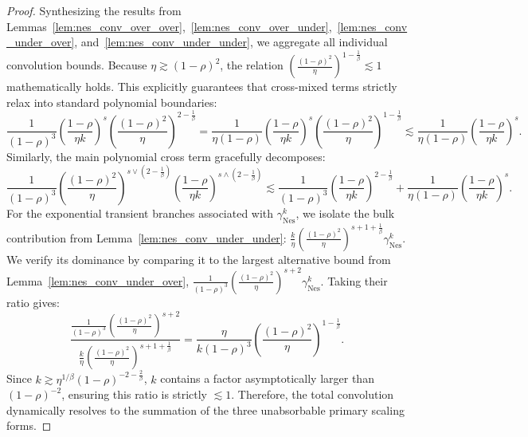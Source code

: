 \begin{proof}
Synthesizing the results from Lemmas~\ref{lem:nes_conv_over_over},~\ref{lem:nes_conv_over_under},~\ref{lem:nes_conv_under_over}, and~\ref{lem:nes_conv_under_under}, we aggregate all individual convolution bounds.
Because $\eta \gtrsim (1-\rho)^2$, the relation $\left(\frac{(1-\rho)^2}{\eta}\right)^{1-\frac{1}{\beta}} \lesssim 1$ mathematically holds. This explicitly guarantees that cross-mixed terms strictly relax into standard polynomial boundaries:
\begin{equation*}
    \frac{1}{(1-\rho)^3} \left(\frac{1-\rho}{\eta k}\right)^s \left(\frac{(1-\rho)^2}{\eta}\right)^{2-\frac{1}{\beta}} = \frac{1}{\eta(1-\rho)} \left(\frac{1-\rho}{\eta k}\right)^s \left(\frac{(1-\rho)^2}{\eta}\right)^{1-\frac{1}{\beta}} \lesssim \frac{1}{\eta(1-\rho)} \left(\frac{1-\rho}{\eta k}\right)^s.
\end{equation*}
Similarly, the main polynomial cross term gracefully decomposes:
\begin{equation*}
    \frac{1}{(1-\rho)^3} \left(\frac{(1-\rho)^2}{\eta}\right)^{s \vee (2-\frac{1}{\beta})} \left(\frac{1-\rho}{\eta k}\right)^{s \wedge (2-\frac{1}{\beta})} \lesssim \frac{1}{(1-\rho)^3} \left(\frac{1-\rho}{\eta k}\right)^{2-\frac{1}{\beta}} + \frac{1}{\eta(1-\rho)} \left(\frac{1-\rho}{\eta k}\right)^s.
\end{equation*}
For the exponential transient branches associated with $\gamma_{\mathrm{Nes}}^k$, we isolate the bulk contribution from Lemma~\ref{lem:nes_conv_under_under}: $\frac{k}{\eta} \left(\frac{(1-\rho)^2}{\eta}\right)^{s+1+\frac{1}{\beta}} \gamma_{\mathrm{Nes}}^k$. We verify its dominance by comparing it to the largest alternative bound from Lemma~\ref{lem:nes_conv_under_over}, $\frac{1}{(1-\rho)^3} \left(\frac{(1-\rho)^2}{\eta}\right)^{s+2} \gamma_{\mathrm{Nes}}^k$. Taking their ratio gives:
\begin{equation*}
    \frac{\frac{1}{(1-\rho)^3} \left(\frac{(1-\rho)^2}{\eta}\right)^{s+2}}{\frac{k}{\eta} \left(\frac{(1-\rho)^2}{\eta}\right)^{s+1+\frac{1}{\beta}}} = \frac{\eta}{k(1-\rho)^3} \left(\frac{(1-\rho)^2}{\eta}\right)^{1-\frac{1}{\beta}}.
\end{equation*}
Since $k \gtrsim \eta^{1/\beta}(1-\rho)^{-2-\frac{2}{\beta}}$, $k$ contains a factor asymptotically larger than $(1-\rho)^{-2}$, ensuring this ratio is strictly $\lesssim 1$. Therefore, the total convolution dynamically resolves to the summation of the three unabsorbable primary scaling forms.
\end{proof}


